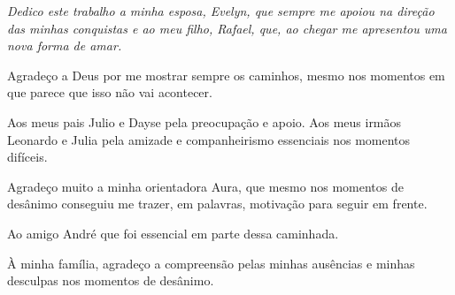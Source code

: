\begin{flushright}
{\em 
Dedico este trabalho a minha esposa, Evelyn, que sempre me apoiou na direção das minhas conquistas e ao meu filho, Rafael, que, ao chegar me apresentou uma nova forma de amar. 
}
\end{flushright}
\newpage


\hspace{5mm}

Agradeço a Deus por me mostrar sempre os caminhos, mesmo nos momentos em que parece que isso não vai acontecer. 

Aos meus pais Julio e Dayse pela preocupação e apoio. Aos meus irmãos Leonardo e Julia pela amizade e companheirismo essenciais nos momentos difíceis.

Agradeço muito a minha orientadora Aura, que mesmo nos momentos de desânimo conseguiu me trazer, em palavras, motivação para seguir em frente.

Ao amigo André que foi essencial em parte dessa caminhada.

À minha família, agradeço a compreensão pelas minhas ausências e minhas desculpas nos momentos de desânimo.


